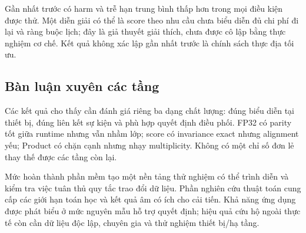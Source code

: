 Gần nhất trước có harm và trễ hạn trung bình thấp hơn trong mọi điều kiện được thử. Một diễn giải có thể là score theo nhu cầu chưa biểu diễn đủ chi phí đi lại và ràng buộc lịch; đây là giả thuyết giải thích, chưa được cô lập bằng thực nghiệm cơ chế. Kết quả không xác lập gần nhất trước là chính sách thực địa tối ưu.

\subsection{Bàn luận xuyên các tầng}
Các kết quả cho thấy cần đánh giá riêng ba dạng chất lượng: đúng biểu diễn tại thiết bị, đúng liên kết sự kiện và phù hợp quyết định điều phối. FP32 có parity tốt giữa runtime nhưng vẫn nhầm lớp; score có invariance exact nhưng alignment yếu; Product có chặn cạnh nhưng nhạy multiplicity. Không có một chỉ số đơn lẻ thay thế được các tầng còn lại.

Mức hoàn thành phần mềm tạo một nền tảng thử nghiệm có thể trình diễn và kiểm tra việc tuân thủ quy tắc trao đổi dữ liệu. Phần nghiên cứu thuật toán cung cấp các giới hạn toán học và kết quả âm có ích cho cải tiến. Khả năng ứng dụng được phát biểu ở mức nguyên mẫu hỗ trợ quyết định; hiệu quả cứu hộ ngoài thực tế còn cần dữ liệu độc lập, chuyên gia và thử nghiệm thiết bị/hạ tầng.
